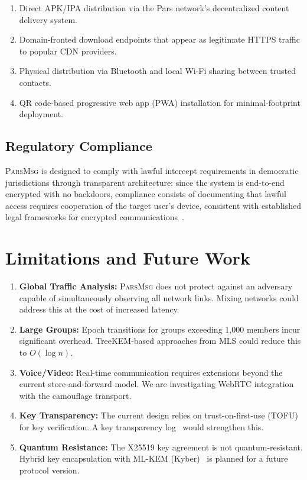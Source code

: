 \documentclass[11pt,a4paper]{article}
\newcommand{\protname}{\textsc{ParsMsg}\xspace}
\begin{document}
\begin{enumerate}
    \item Direct APK/IPA distribution via the Pars network's decentralized content delivery system.
    \item Domain-fronted download endpoints that appear as legitimate HTTPS traffic to popular CDN providers.
    \item Physical distribution via Bluetooth and local Wi-Fi sharing between trusted contacts.
    \item QR code-based progressive web app (PWA) installation for minimal-footprint deployment.
\end{enumerate}

\subsection{Regulatory Compliance}

\protname is designed to comply with lawful intercept requirements in democratic jurisdictions through transparent architecture: since the system is end-to-end encrypted with no backdoors, compliance consists of documenting that lawful access requires cooperation of the target user's device, consistent with established legal frameworks for encrypted communications~\citep{abelson2015keys}.

\section{Limitations and Future Work}

\begin{enumerate}
    \item \textbf{Global Traffic Analysis:} \protname does not protect against an adversary capable of simultaneously observing all network links. Mixing networks could address this at the cost of increased latency.
    \item \textbf{Large Groups:} Epoch transitions for groups exceeding 1{,}000 members incur significant overhead. TreeKEM-based approaches from MLS could reduce this to $O(\log n)$.
    \item \textbf{Voice/Video:} Real-time communication requires extensions beyond the current store-and-forward model. We are investigating WebRTC integration with the camouflage transport.
    \item \textbf{Key Transparency:} The current design relies on trust-on-first-use (TOFU) for key verification. A key transparency log~\citep{melara2015coniks} would strengthen this.
    \item \textbf{Quantum Resistance:} The X25519 key agreement is not quantum-resistant. Hybrid key encapsulation with ML-KEM (Kyber)~\citep{bos2018crystals} is planned for a future protocol version.
\end{enumerate}
\end{document}
